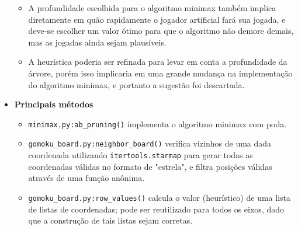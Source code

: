 \documentclass{article}
\begin{document}
\begin{itemize}
\begin{itemize}
            \item A profundidade escolhida para o algoritmo minimax também
                implica diretamente em quão rapidamente o jogador artificial
                fará sua jogada, e deve-se escolher um valor ótimo para que o
                algoritmo não demore demais, mas as jogadas ainda sejam
                plausíveis.

            \item A heurística poderia ser refinada para levar em conta a
                profundidade da árvore, porém isso implicaria em uma grande
                mudança na implementação do algoritmo minimax, e portanto a
                sugestão foi descartada.

        \end{itemize}

    \item \textbf{Principais métodos}

        \begin{itemize}

            \item \texttt{minimax.py:ab\_pruning()} implementa o algoritmo
                minimax com poda.

            \item \texttt{gomoku\_board.py:neighbor\_board()} verifica
                vizinhos de uma dada coordenada utilizando
                \texttt{itertools.starmap} para gerar todas as coordenadas
                válidas no formato de "estrela", e filtra posições válidas
                através de uma função anônima.

            \item \texttt{gomoku\_board.py:row\_values()} calcula o valor
                (heurístico) de uma lista de listas de coordenadas; pode ser
                reutilizado para todos os eixos, dado que a construção de tais
                listas sejam corretas.

        \end{itemize}

\end{itemize}
\end{document}
